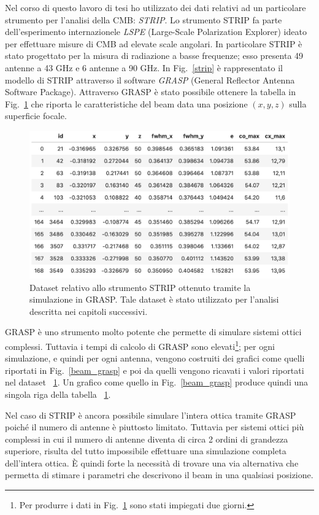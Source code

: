 \documentclass[12pt,a4paper,final]{book}
\begin{document}
Nel corso di questo lavoro di tesi ho utilizzato dei dati relativi ad un particolare strumento per l'analisi della CMB: \textit{STRIP}.
Lo strumento STRIP fa parte dell'esperimento internazionele \textit{LSPE} (Large-Scale Polarization Explorer) ideato per effettuare misure di CMB ad elevate scale angolari.
In particolare STRIP è stato progettato per la misura di radiazione a basse frequenze; esso presenta 49 antenne a 43 GHz e 6 antenne a 90 GHz. In Fig.~\ref{strip} è rappresentato il modello di STRIP attraverso il software \textit{GRASP} (General Reflector Antenna Software Package).
Attraverso GRASP è stato possibile ottenere la tabella in Fig.~\ref{dataset} che riporta le caratteristiche del beam data una posizione $(x, y, z)$ sulla superficie focale.

\begin{figure}[!ht]
	\centering
	\includegraphics[width=0.8\linewidth]{../figures/dataset.png}
	\caption{Dataset relativo allo strumento STRIP ottenuto tramite la simulazione in GRASP. Tale dataset è stato utilizzato per l'analisi descritta nei capitoli successivi.}
	\label{dataset}
\end{figure}

GRASP è uno strumento molto potente che permette di simulare sistemi ottici complessi.
Tuttavia i tempi di calcolo di GRASP sono elevati\footnote{Per produrre i dati in Fig.~\ref{dataset} sono stati impiegati due giorni.}; per ogni simulazione, e quindi per ogni antenna, vengono costruiti dei grafici come quelli riportati in Fig.~\ref{beam_grasp} e poi da quelli vengono ricavati i valori riportati nel dataset ~\ref{dataset}.
Un grafico come quello in Fig.~\ref{beam_grasp} produce quindi una singola riga della tabella ~\ref{dataset}.


Nel caso di STRIP è ancora possibile simulare l'intera ottica tramite GRASP poiché il numero di antenne è piuttosto limitato. Tuttavia per sistemi ottici più complessi in cui il numero di antenne diventa di circa 2 ordini di grandezza superiore, risulta del tutto impossibile effettuare una simulazione completa dell'intera ottica.
\`E quindi forte la necessità di trovare una via alternativa che permetta di stimare i parametri che descrivono il beam in una qualsiasi posizione.
\end{document}
